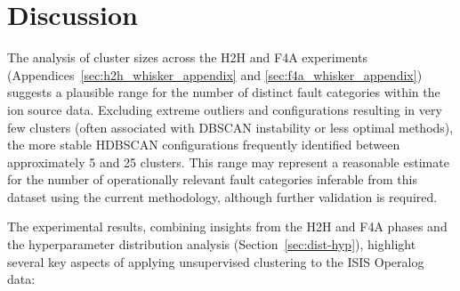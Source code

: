 \documentclass[10pt,oneside]{report}
\begin{document}
\section{Discussion}\label{sec:discussion} 

The analysis of cluster sizes across the H2H and F4A experiments (Appendices~\ref{sec:h2h_whisker_appendix} and \ref{sec:f4a_whisker_appendix}) suggests a plausible range for the number of distinct fault categories within the ion source data. Excluding extreme outliers and configurations resulting in very few clusters (often associated with DBSCAN instability or less optimal methods), the more stable HDBSCAN configurations frequently identified between approximately 5 and 25 clusters. This range may represent a reasonable estimate for the number of operationally relevant fault categories inferable from this dataset using the current methodology, although further validation is required.



The experimental results, combining insights from the H2H and F4A phases and the hyperparameter distribution analysis (Section~\ref{sec:dist-hyp}), highlight several key aspects of applying unsupervised clustering to the ISIS Operalog data:
\end{document}

